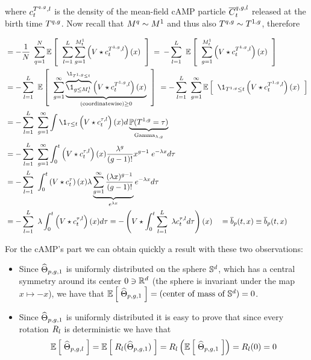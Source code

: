 where $c_t^{T^{q,g},l}$ is the density of the mean-field cAMP particle $\overline{C}_t^{q,g,l}$ released at the birth time $T^{q,g}$.
Now recall that $M^q \sim M^1$ and thus also $T^{q,g} \sim T^{1,g}$, therefore

\begin{align*}
	&= 
	- \frac{1}{N}\
	\sum _{q = 1}^{N} 
	\E{\; 
		 \sum _{l = 1}^{\NumCampRelease}
		\sum_{g = 1}^{\hmactive_t^1} 
		\left( \attraction \star \cdens_t^{\btime^{1,g},l} \right) (x)
		\;}
	\:=\: 
	- \sum _{l = 1}^{\NumCampRelease}\
	\E{\; 
		\sum_{g = 1}^{\hmactive_t^1} 
		\left( \attraction \star \cdens_t^{\btime^{1,g},l} \right) (x)
		\;}
	\\
	&=
	- \sum _{l = 1}^{\NumCampRelease}\
	\E{\; 
		\sum_{g = 1}^{\infty} 
		\underbrace{
			\overbrace{
				\1_{g \leq \hmactive_t^1}
			}^{
				\1_{\btime^{1,g} \leq t}
			}
			\left( \attraction \star \cdens_t^{\btime^{1,g},l} \right) (x)
		}_{\text{(coordinatewise)}\geq 0}
		\;}\
		= 
	- \sum _{l = 1}^{\NumCampRelease}\
	\sum_{g = 1}^{\infty}
	\E{\; \1_{\btime^{1,g} \leq t}
		\left( \attraction \star \cdens_t^{\btime^{1,g},l} \right) (x)
		\;} 
		\\
&= 
	- \sum _{l = 1}^{\NumCampRelease}\
	\sum_{g = 1}^{\infty}
	\int
	\1_{\tau \leq t}
	\left( \attraction \star \cdens_t^{\tau,l} \right) (x)
	d \underbrace{\Prb ( \btime^{1,g} = \tau )}_{\Gma_{\lambda, g}}
	\\
	&= 
	- \sum _{l = 1}^{\NumCampRelease}\
	\sum_{g = 1}^{\infty}
	\int_0^t
	\left( \attraction \star \cdens_t^{\tau,l} \right) (x)
	\frac{\lambda^g}{(g-1)!} x^{g-1} \; e^{ - \lambda x}
	d \tau
	\\
	&= 
	- \sum _{l = 1}^{\NumCampRelease}\
	\int_0^t
	\left( \attraction \star \cdens_t^\tau \right) (x)
	\lambda
	\underbrace{
		\sum_{g = 1}^{\infty} \frac{(\lambda x)^{g-1}}{(g-1)!}
	}_{e^{\lambda x}}
	e^{ - \lambda x}
	d \tau
	\\
	&= 
	- \sum _{l = 1}^{\NumCampRelease}\
	\lambda \int_0^t
	\left( \attraction \star \cdens_t^{\tau,l} \right) (x)
	d \tau
	=
	- \left( 
	\attraction \star \int_0^t \sum _{l = 1}^{\NumCampRelease}\
	\lambda \cdens_t^{\tau,l} d \tau
	\right) (x) 
	\quad
	= \mfdrift_p (t, x) 
	\equiv
	\mfdrift_p (t, x)
\end{align*}

For the cAMP's part we can obtain quickly a result with these two observations:
\begin{itemize}
	\item Since $\widehat{\Theta}_{p,g,1}$ is uniformly distributed on the sphere $\mathbb{S}^d$, which has a central symmetry around its center $0\ni\mathbb{R}^d$ (\ie the sphere is invariant under the map $x \longmapsto -x$), we have that $\mathbb{E} \left[ \; \widehat{\Theta}_{p,g,1} \; \right]= (\text{center of mass of $\mathbb{S}^d$}) =0$.
	\item Since $\widehat{\Theta}_{p,g,1}$ is uniformly distributed it is easy to prove that since every rotation $R_l$ is deterministic we have that
	\begin{equation*}
		\mathbb{E} \left[ \; \widehat{\Theta}_{p,g,l} \; \right] = \mathbb{E} \left[ \; R_l(\widehat{\Theta}_{p,g,1}) \; \right] = R_l \left(\mathbb{E} \left[ \; \widehat{\Theta}_{p,g,1} \; \right] \right) = R_l (0) = 0
	\end{equation*}
\end{itemize}

